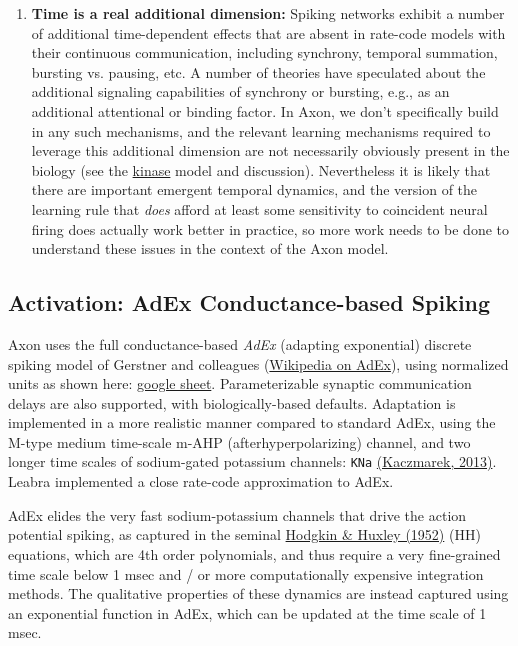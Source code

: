 \documentclass[11pt,twoside]{article}
\newif\myifpdf
\begin{document}
\begin{enumerate}
\item \textbf{Time is a real additional dimension:} Spiking networks exhibit a number of additional time-dependent effects that are absent in rate-code models with their continuous communication, including synchrony, temporal summation, bursting vs. pausing, etc. A number of theories have speculated about the additional signaling capabilities of synchrony or bursting, e.g., as an additional attentional or binding factor. In Axon, we don't specifically build in any such mechanisms, and the relevant learning mechanisms required to leverage this additional dimension are not necessarily obviously present in the biology (see the \href{https://github.com/ccnlab/kinase/tree/main/sims/kinase}{kinase} model and discussion). Nevertheless it is likely that there are important emergent temporal dynamics, and the version of the learning rule that \emph{does} afford at least some sensitivity to coincident neural firing does actually work better in practice, so more work   needs to be done to understand these issues in the context of the Axon model.

\end{enumerate}

\subsection{Activation: AdEx Conductance-based Spiking}

Axon uses the full conductance-based \emph{AdEx} (adapting exponential) discrete spiking model of Gerstner and colleagues (\href{https://en.wikipedia.org/wiki/Exponential_integrate-and-fire}{Wikipedia on AdEx}), using normalized units as shown here: \href{https://docs.google.com/spreadsheets/d/1jn-NcXY4-y3pOw6inFOgPYlaQodrGIjcsAWkiD9f1FQ/edit?usp=sharing}{google sheet}. Parameterizable synaptic communication delays are also supported, with biologically-based defaults. Adaptation is implemented in a more realistic manner compared to standard AdEx, using the M-type medium time-scale m-AHP (afterhyperpolarizing) channel, and two longer time scales of sodium-gated potassium channels: \texttt{KNa} \protect\hyperlink{references}{(Kaczmarek, 2013)}. Leabra implemented a close rate-code approximation to AdEx.

AdEx elides the very fast sodium-potassium channels that drive the action potential spiking, as captured in the seminal \protect\hyperlink{references}{Hodgkin \& Huxley (1952)} (HH) equations, which are 4th order polynomials, and thus require a very fine-grained time scale below 1 msec and / or more computationally expensive integration methods. The qualitative properties of these dynamics are instead captured using an exponential function in AdEx, which can be updated at the time scale of 1 msec.
\end{document}
